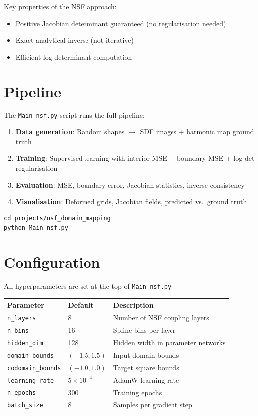\documentclass[11pt,a4paper]{report}
\begin{document}
Key properties of the NSF approach:
\begin{itemize}[leftmargin=2em]
    \item Positive Jacobian determinant guaranteed (no regularisation needed)
    \item Exact analytical inverse (not iterative)
    \item Efficient log-determinant computation
\end{itemize}

\section{Pipeline}

The \texttt{Main\_nsf.py} script runs the full pipeline:

\begin{enumerate}[leftmargin=2em]
    \item \textbf{Data generation}: Random shapes $\to$ SDF images + harmonic map ground truth
    \item \textbf{Training}: Supervised learning with interior MSE + boundary MSE + log-det regularisation
    \item \textbf{Evaluation}: MSE, boundary error, Jacobian statistics, inverse consistency
    \item \textbf{Visualisation}: Deformed grids, Jacobian fields, predicted vs.\ ground truth
\end{enumerate}

\begin{lstlisting}[style=bash,caption={Running the NSF project}]
cd projects/nsf_domain_mapping
python Main_nsf.py
\end{lstlisting}

\section{Configuration}

All hyperparameters are set at the top of \texttt{Main\_nsf.py}:

\begin{longtable}{lll}
\toprule
\textbf{Parameter} & \textbf{Default} & \textbf{Description} \\
\midrule
\texttt{n\_layers} & 8 & Number of NSF coupling layers \\
\texttt{n\_bins} & 16 & Spline bins per layer \\
\texttt{hidden\_dim} & 128 & Hidden width in parameter networks \\
\texttt{domain\_bounds} & $(-1.5, 1.5)$ & Input domain bounds \\
\texttt{codomain\_bounds} & $(-1.0, 1.0)$ & Target square bounds \\
\texttt{learning\_rate} & $5 \times 10^{-4}$ & AdamW learning rate \\
\texttt{n\_epochs} & 300 & Training epochs \\
\texttt{batch\_size} & 8 & Samples per gradient step \\
\bottomrule
\end{longtable}
\end{document}
